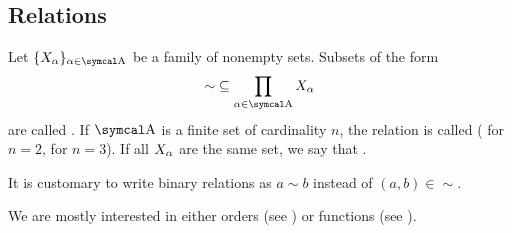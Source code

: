 \subsection{Relations}\label{subsec:relations}

\begin{definition}\label{def:relation}
  Let \( \{ X_\al \}_{\al \in \CA} \) be a family of nonempty sets.
  Subsets of the form
  \begin{equation*}
    \sim\; \subseteq \prod_{\al \in \CA} X_\al
  \end{equation*}
  are called . If \( \CA \) is a finite set of cardinality \( n \), the relation is called  ( for \( n = 2 \),  for \( n = 3 \)). If all \( X_\alpha \) are the same set, we say that .

  It is customary to write binary relations as \( a \sim b \) instead of \( (a, b) \in \sim \).
\end{definition}

\begin{remark}\label{remark:main_relation_types}
  We are mostly interested in either orders (see ) or functions (see ).
\end{remark}

